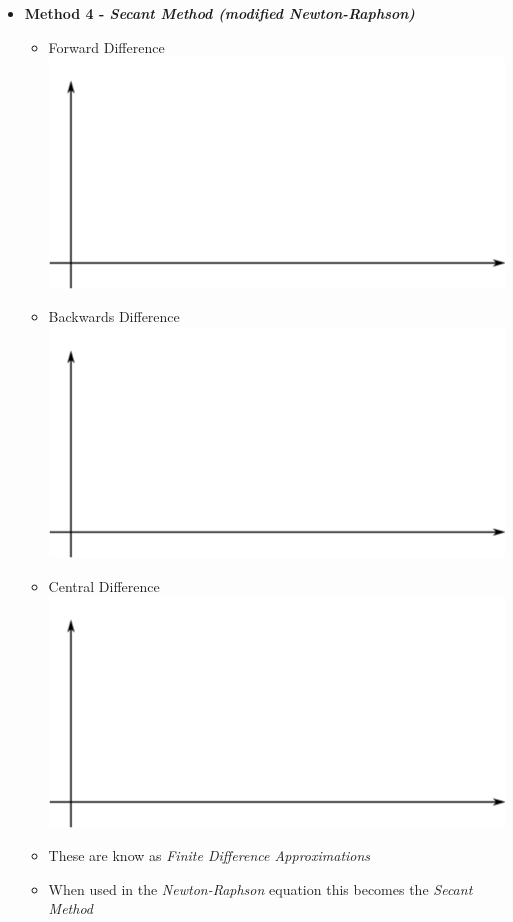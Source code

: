 \documentclass[11pt]{article}
\begin{document}
\begin{itemize}
\begin{itemize}
		\end{itemize}
\newpage

	\item \textbf{ \LARGE Method 4 - {\it Secant Method (modified Newton-Raphson)}}
\begin{itemize}	
	\item \LARGE{Forward Difference}\\
	\includegraphics[scale=.35]{lecture2_fig6.png}\\
	\item \LARGE{Backwards Difference}\\
	\includegraphics[scale=.35]{lecture2_fig6.png}\\
	\item \LARGE{Central Difference}\\
	\includegraphics[scale=.35]{lecture2_fig6.png}
\newpage
	\item \LARGE{These are know as {\it Finite Difference Approximations} }\\
	\item \LARGE{When used in the {\it Newton-Raphson} equation this becomes the {\it Secant Method} }\\
		

\end{itemize}
\end{itemize}
\end{document}
